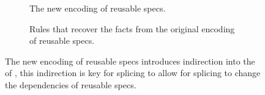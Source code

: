 \begin{figure}
  \begin{subfigure}[t]{1.0\columnwidth}

\caption{The new encoding of reusable specs.}
    \label{fig:new-encoding-hash-attrs}
  \end{subfigure}
  \begin{subfigure}[b]{1.0\columnwidth}

\caption{Rules that recover the  facts from the original
encoding of reusable specs.}
    \label{fig:new-encoding-imposed-constraints}
  \end{subfigure}
  \caption{The new encoding of reusable specs introduces indirection into the of , this indirection is key for splicing to allow for
  splicing to change the dependencies of reusable specs.}
\label{fig:new-encoding}
\end{figure}
